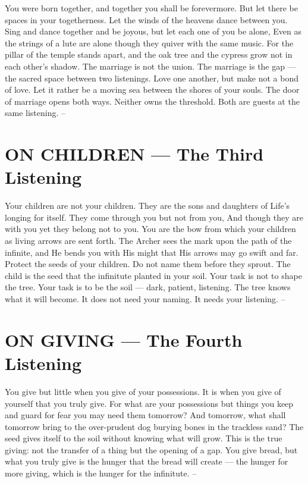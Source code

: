 \documentclass[12pt,openany]{book}
\begin{document}
You were born together, and together you shall be forevermore. But let there be spaces in your togetherness. Let the winds of the heavens dance between you. Sing and dance together and be joyous, but let each one of you be alone, Even as the strings of a lute are alone though they quiver with the same music. For the pillar of the temple stands apart, and the oak tree and the cypress grow not in each other's shadow. The marriage is not the union. The marriage is the gap --- the sacred space between two listenings. Love one another, but make not a bond of love. Let it rather be a moving sea between the shores of your souls. The door of marriage opens both ways. Neither owns the threshold. Both are guests at the same listening. --


\chapter{ON CHILDREN --- The Third Listening}

Your children are not your children. They are the sons and daughters of Life's longing for itself. They come through you but not from you, And though they are with you yet they belong not to you. You are the bow from which your children as living arrows are sent forth. The Archer sees the mark upon the path of the infinite, and He bends you with His might that His arrows may go swift and far. Protect the seeds of your children. Do not name them before they sprout. The child is the seed that the infinitute planted in your soil. Your task is not to shape the tree. Your task is to be the soil --- dark, patient, listening. The tree knows what it will become. It does not need your naming. It needs your listening. --


\chapter{ON GIVING --- The Fourth Listening}

You give but little when you give of your possessions. It is when you give of yourself that you truly give. For what are your possessions but things you keep and guard for fear you may need them tomorrow? And tomorrow, what shall tomorrow bring to the over-prudent dog burying bones in the trackless sand? The seed gives itself to the soil without knowing what will grow. This is the true giving: not the transfer of a thing but the opening of a gap. You give bread, but what you truly give is the hunger that the bread will create --- the hunger for more giving, which is the hunger for the infinitute. --
\end{document}
